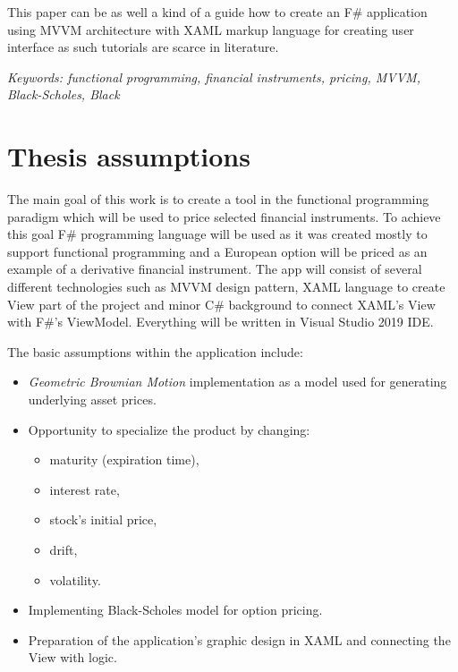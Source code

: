     This paper can be as well a kind of a guide how to create an F\# application using MVVM architecture with XAML markup language for creating user interface as such tutorials are scarce in literature.
    
    \emph{Keywords: functional programming, financial instruments, pricing, MVVM, Black-Scholes, Black}

\section{Thesis assumptions}
    The main goal of this work is to create a tool in the functional programming paradigm which will be used to price selected financial instruments. To achieve this goal F\# programming language will be used as it was created mostly to support functional programming and a European option will be priced as an example of a derivative financial instrument.
    The app will consist of several different technologies such as MVVM design pattern, XAML language to create View part of the project and minor C\# background to connect XAML's View with F\#'s ViewModel. Everything will be written in Visual Studio 2019 IDE.
    
    The basic assumptions within the application include:
    \begin{itemize}
        \item \textit{Geometric Brownian Motion} implementation as a model used for generating underlying asset prices.
        \item Opportunity to specialize the product by changing:
            \begin{itemize}
                \item maturity (expiration time),
                \item interest rate,
                \item stock's initial price,
                \item drift,
                \item volatility.
            \end{itemize}
        \item Implementing Black-Scholes model for option pricing.
        \item Preparation of the application's graphic design in XAML and connecting the View with logic.
    \end{itemize}


